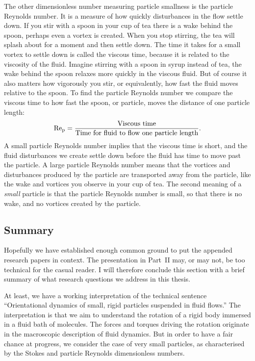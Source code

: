 \documentclass[thesis.tex]{subfiles}
\begin{document}
The other dimensionless number measuring particle smallness is the particle Reynolds number. It is a measure of how quickly disturbances in the flow settle down. If you stir with a spoon in your cup of tea there is a wake behind the spoon, perhaps even a vortex is created. When you stop stirring, the tea will splash about for a moment and then settle down. The time it takes for a small vortex to settle down is called the viscous time, because it is related to the viscosity of the fluid. Imagine stirring with a spoon in syrup instead of tea, the wake behind the spoon relaxes more quickly in the viscous fluid. But of course it also matters how vigorously you stir, or equivalently, how fast the fluid moves relative to the spoon. To find the particle Reynolds number we compare the viscous time to how fast the spoon, or particle, moves the distance of one particle length:
\begin{align*}
 	\mbox{Re}_{\mathrm p} = \frac{\textrm{Viscous time}}{\textrm{Time for fluid to flow one particle length}}.
 \end{align*} 
A small particle Reynolds number implies that the viscous time is short, and the fluid disturbances we create settle down before the fluid has time to move past the particle. A large particle Reynolds number means that the vortices and disturbances produced by the particle are transported away from the particle, like the wake and vortices you observe in your cup of tea. The second meaning of a \emph{small} particle is that the particle Reynolds number is small, so that there is no wake, and no vortices created by the particle.

\subsection*{Summary}

Hopefully we have established enough common ground to put the appended research papers in context. The presentation in Part~II may, or may not, be too technical for the casual reader. I will therefore conclude this section with a brief summary of what research questions we address in this thesis.

At least, we have a working interpretation of the technical sentence ``Orientational dynamics of small, rigid particles suspended in fluid flows.'' The interpretation is that we aim to understand the rotation of a rigid body immersed in a fluid bath of molecules. The forces and torques driving the rotation originate in the macroscopic description of fluid dynamics. But in order to have a fair chance at progress, we consider the case of very small particles, as characterised by the Stokes and particle Reynolds dimensionless numbers.
\end{document}

